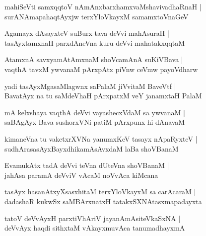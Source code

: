 \begin{shloka}
mahiSeVti samxqqtoV nAmAnxbarxhamxvaMshavivadhaRnaH |\\
surANAmapahaqtAyxjw terxYloVkayxM samamxtoVnaGeV 
\end{shloka}

\begin{shloka}
Agamayx dAsayxteV suBurx tava deVvi mahAsuraH |\\
tasAyxtamxnaH parxdAneVna kuru deVvi mahatakxqqtaM 
\end{shloka}

\begin{shloka}
AtamxnA savxyamAtAmxnaM shoVcamAnA suKiVBava |\\
vaqthA tavxM ywvanaM pArxpAtx piVnw ceVmw payoVdharw
\end{shloka}

\begin{shloka}
yadi tasAyxMgasaMlagwnx saPalaM jiVvitaM BaveVtf |\\
BavatAyx na tu saMdeVhaH pArxpatxM veY janamxtaH PalaM 
\end{shloka}

\begin{shloka}
mA kelxshaya vaqthA deVvi vayashecxVdaM sa ywvanaM |\\
saBAgAyx Bava sushorxVNi patiM pArxpunx hi dAnavaM 
\end{shloka}

\begin{shloka}
kimaneVna tu vaketxrXVNa yanumxKeV tasayx nApaRyxteV |\\
sudhArasasAyxBayxdhikamAsAvxdaM laBa shoVBanaM 
\end{shloka}

\begin{shloka}
EvamukAtx tadA deVvi teVna dUteVna shoVBanaM |\\
jahAsa paramA deVviV vAcaM noVvAca kiMcana
\end{shloka}

\begin{shloka}
tasAyx hasanAtxyXsasxhitaM terxYloVkayxM sa carAcaraM |\\
dadashaR kukwSx saMBArxnatxH tatakxSXNAtasxmapadayxta
\end{shloka}

\begin{shloka}
tatoV deVvAyxH parxtiVhAriV jayanAmAsiteVkaSxNA |\\
deVvAyx haqdi sithxtaM vAkayxmuvAca tanumadhayxmA
\end{shloka}

